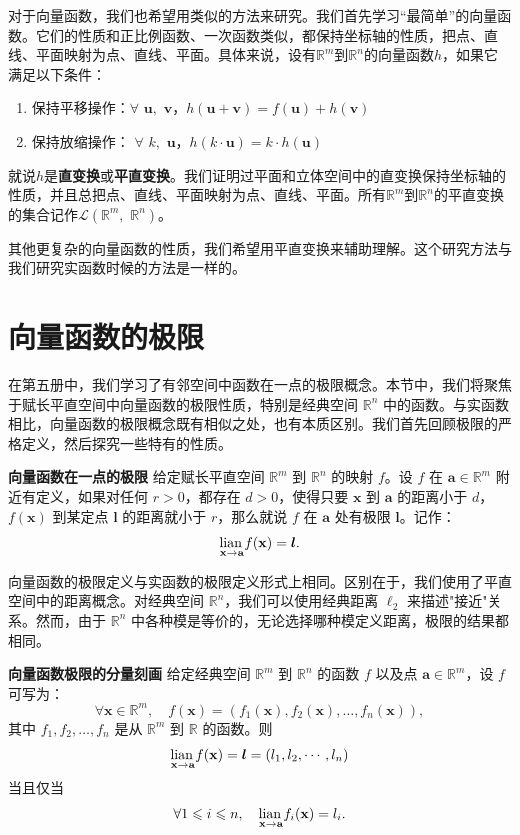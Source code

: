 \documentclass[12pt,UTF8]{ctexbook}
\begin{document}
对于向量函数，我们也希望用类似的方法来研究。我们首先学习“最简单”的向量函数。它们的性质和正比例函数、一次函数类似，都保持坐标轴的性质，把点、直线、平面映射为点、直线、平面。具体来说，设有$\mathbb{R}^m$到$\mathbb{R}^n$的向量函数$h$，如果它满足以下条件：
\begin{enumerate}[label=\arabic*.]
    \item 保持平移操作：$\forall \,\,\mathbf{u}, \,\,\mathbf{v}$，$h(\mathbf{u} + \mathbf{v}) = f(\mathbf{u}) + h(\mathbf{v})$
    \item 保持放缩操作： $\forall \,\,k, \,\, \mathbf{u}$，$h(k\cdot \mathbf{u}) = k \cdot h(\mathbf{u})$
\end{enumerate}
就说$h$是\textbf{直变换}或\textbf{平直变换}。我们证明过平面和立体空间中的直变换保持坐标轴的性质，并且总把点、直线、平面映射为点、直线、平面。所有$\mathbb{R}^m$到$\mathbb{R}^n$的平直变换的集合记作$\mathcal{L}(\mathbb{R}^m, \,\,\mathbb{R}^n)$。

其他更复杂的向量函数的性质，我们希望用平直变换来辅助理解。这个研究方法与我们研究实函数时候的方法是一样的。

\section{向量函数的极限}

在第五册中，我们学习了有邻空间中函数在一点的极限概念。本节中，我们将聚焦于赋长平直空间中向量函数的极限性质，特别是经典空间 $\mathbb{R}^n$ 中的函数。与实函数相比，向量函数的极限概念既有相似之处，也有本质区别。我们首先回顾极限的严格定义，然后探究一些特有的性质。

\begin{df}{\textbf{向量函数在一点的极限}}
给定赋长平直空间 $\mathbb{R}^m$ 到 $\mathbb{R}^n$ 的映射 $f$。设 $f$ 在 $\mathbf{a}\in\mathbb{R}^m$ 附近有定义，如果对任何 $r>0$，都存在 $d>0$，使得只要 $\mathbf{x}$ 到 $\mathbf{a}$ 的距离小于 $d$，$f(\mathbf{x})$ 到某定点 $\boldsymbol{l}$ 的距离就小于 $r$，那么就说 $f$ 在 $\mathbf{a}$ 处有极限 $\boldsymbol{l}$。记作：
$$ \underset{\mathbf{x}\to \mathbf{a}}{\operatorname{lian}\,} f(\mathbf{x}) = \boldsymbol{l}. $$
\end{df}

向量函数的极限定义与实函数的极限定义形式上相同。区别在于，我们使用了平直空间中的距离概念。对经典空间 $\mathbb{R}^n$，我们可以使用经典距离 $\ell_2$ 来描述"接近"关系。然而，由于 $\mathbb{R}^n$ 中各种模是等价的，无论选择哪种模定义距离，极限的结果都相同。

\begin{tm}{\textbf{向量函数极限的分量刻画}}
给定经典空间 $\mathbb{R}^m$ 到 $\mathbb{R}^n$ 的函数 $f$ 以及点 $\mathbf{a}\in\mathbb{R}^m$，设 $f$ 可写为：
$$ \forall \mathbf{x} \in \mathbb{R}^m, \quad f(\mathbf{x}) = (f_1(\mathbf{x}), f_2(\mathbf{x}), \ldots, f_n(\mathbf{x})), $$
其中 $f_1, f_2, \ldots, f_n$ 是从 $\mathbb{R}^m$ 到 $\mathbb{R}$ 的函数。则
$$ \underset{\mathbf{x}\to \mathbf{a}}{\operatorname{lian}\,} f(\mathbf{x}) = \boldsymbol{l} = (l_1, l_2, \cdots, l_n) $$
当且仅当
$$ \forall 1 \leqslant i \leqslant n, \quad \underset{\mathbf{x}\to \mathbf{a}}{\operatorname{lian}\,} f_i(\mathbf{x}) = l_i. $$
\end{tm}
\end{document}
